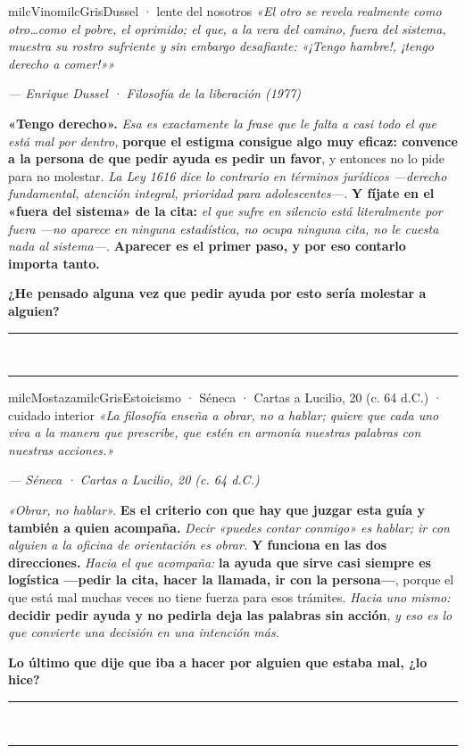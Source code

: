 \documentclass[11pt,letterpaper]{article}
\newcommand{\linead}[1]{\noindent\color{milcLinea}\rule{#1}{0.5pt}\color{milcNegro}}
\begin{document}
\begin{softbox}{milcVino}{milcGris}{Dussel · lente del nosotros}
\textit{«El otro se revela realmente como otro\ldots como el pobre, el oprimido; el que, a la vera del camino, fuera del sistema, muestra su rostro sufriente y sin embargo desafiante: «¡Tengo hambre!, ¡tengo derecho a comer!»»}

{\footnotesize\itshape\color{milcNegro!70}--- Enrique Dussel · Filosofía de la liberación (1977)}

\textbf{«Tengo derecho».} \emph{Esa es exactamente la frase que le falta a casi todo el que está mal por dentro,} \textbf{porque el estigma consigue algo muy eficaz: convence a la persona de que pedir ayuda es pedir un favor}, y entonces no lo pide para no molestar. \emph{La Ley 1616 dice lo contrario en términos jurídicos ---derecho fundamental, atención integral, prioridad para adolescentes---.} \textbf{Y fíjate en el «fuera del sistema» de la cita:} \emph{el que sufre en silencio está literalmente por fuera ---no aparece en ninguna estadística, no ocupa ninguna cita, no le cuesta nada al sistema---.} \textbf{Aparecer es el primer paso, y por eso contarlo importa tanto.}

\textbf{¿He pensado alguna vez que pedir ayuda por esto sería molestar a alguien?}
\end{softbox}
\linead{\linewidth}\\[1mm]
\linead{\linewidth}

\begin{softbox}{milcMostaza}{milcGris}{Estoicismo · Séneca · Cartas a Lucilio, 20 (c. 64 d.C.) · cuidado interior}
\textit{«La filosofía enseña a obrar, no a hablar; quiere que cada uno viva a la manera que prescribe, que estén en armonía nuestras palabras con nuestras acciones.»}

{\footnotesize\itshape\color{milcNegro!70}--- Séneca · Cartas a Lucilio, 20 (c. 64 d.C.)}

\emph{«Obrar, no hablar».} \textbf{Es el criterio con que hay que juzgar esta guía y también a quien acompaña.} \emph{Decir «puedes contar conmigo» es hablar; ir con alguien a la oficina de orientación es obrar.} \textbf{Y funciona en las dos direcciones.} \emph{Hacia el que acompaña:} \textbf{la ayuda que sirve casi siempre es logística ---pedir la cita, hacer la llamada, ir con la persona---}, porque el que está mal muchas veces no tiene fuerza para esos trámites. \emph{Hacia uno mismo:} \textbf{decidir pedir ayuda y no pedirla deja las palabras sin acción}, \emph{y eso es lo que convierte una decisión en una intención más.}

\textbf{Lo último que dije que iba a hacer por alguien que estaba mal, ¿lo hice?}
\end{softbox}
\linead{\linewidth}\\[1mm]
\linead{\linewidth}
\end{document}
